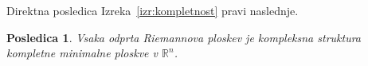 \documentclass[12pt,a4paper,twoside]{article}
\newcommand{\literatura}{literatura}  %
\theoremstyle{definition} %
\theoremstyle{plain} %
\newtheorem{posledica}[definicija]{Posledica}
\numberwithin{equation}{section}  %
\newcommand{\R}{\mathbb R}
\begin{document}
Direktna posledica Izreka~\ref{izr:kompletnost} pravi naslednje.

\begin{posledica}
Vsaka odprta Riemannova ploskev je kompleksna struktura kompletne minimalne ploskve v $\R^{n}$.
\end{posledica}


\cleardoublepage                           %

\cleardoublepage                           %
\printindex
\end{document}
